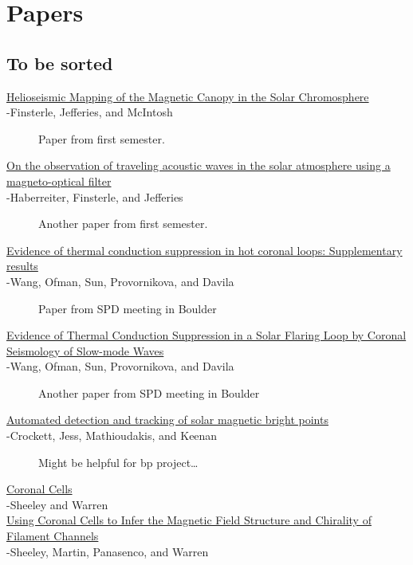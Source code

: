 \documentclass{article}
\begin{document}
\section{Papers}
\subsection{To be sorted}
\begin{description}
    \item [\href{http://adsabs.harvard.edu/abs/2004ApJ...613L.185F}
            {Helioseismic Mapping of the Magnetic Canopy in the Solar Chromosphere}\\
        -Finsterle, Jefferies, and McIntosh]
        Paper from first semester.
    \item [\href{http://cdsads.u-strasbg.fr/abs/2007AN....328..211H}
        {On the observation of traveling acoustic waves in the solar
            atmosphere using a magneto-optical filter}\\
        -Haberreiter, Finsterle, and Jefferies]
        Another paper from first semester.
    \item [\href{http://cdsads.u-strasbg.fr/abs/2015arXiv151002750W}
        {Evidence of thermal conduction suppression in hot coronal loops:
            Supplementary results}\\
        -Wang, Ofman, Sun, Provornikova, and Davila]
        Paper from SPD meeting in Boulder
	\item [\href{http://cdsads.u-strasbg.fr/abs/2015ApJ...811L..13W`}
        {Evidence of Thermal Conduction Suppression in a Solar Flaring
            Loop by Coronal Seismology of Slow-mode Waves}\\
        -Wang, Ofman, Sun, Provornikova, and Davila]
        Another paper from SPD meeting in Boulder
	\item [\href{http://cdsads.u-strasbg.fr/abs/2009MNRAS.397.1852C}
        {Automated detection and tracking of solar magnetic bright points}\\
        -Crockett, Jess, Mathioudakis, and Keenan]
        Might be helpful for bp project\ldots
	\item [\href{http://cdsads.u-strasbg.fr/abs/2012ApJ...749...40S}
        {Coronal Cells}\\
        -Sheeley and Warren]
	\item [\href{http://cdsads.u-strasbg.fr/abs/2013ApJ...772...88S}
        {Using Coronal Cells to Infer the Magnetic Field Structure and
            Chirality of Filament Channels}\\
        -Sheeley, Martin, Panasenco, and Warren]
\end{description}
\end{document}
